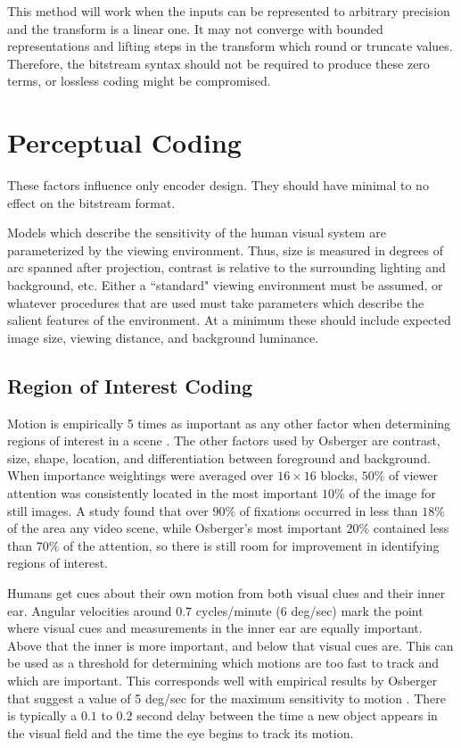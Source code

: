 \documentclass[11pt,letterpaper]{article}
\begin{document}
This method will work when the inputs can be represented to arbitrary precision
 and the transform is a linear one.
It may not converge with bounded representations and lifting steps in the
 transform which round or truncate values.
Therefore, the bitstream syntax should not be required to produce these zero
 terms, or lossless coding might be compromised.


\section{Perceptual Coding}

These factors influence only encoder design.
They should have minimal to no effect on the bitstream format.

Models which describe the sensitivity of the human visual system are
 parameterized by the viewing environment.
Thus, size is measured in degrees of arc spanned after projection, contrast is
 relative to the surrounding lighting and background, etc.
Either a ``standard" viewing environment must be assumed, or whatever
 procedures that are used must take parameters which describe the salient
 features of the environment.
At a minimum these should include expected image size, viewing distance, and
 background luminance.

\subsection{Region of Interest Coding}

Motion is empirically 5 times as important as any other factor when determining
 regions of interest in a scene \cite{Osb99, NC96}.
The other factors used by Osberger are contrast, size, shape, location, and
 differentiation between foreground and background.
When importance weightings were averaged over $16\times 16$ blocks, $50\%$ of
 viewer attention was consistently located in the most important $10\%$ of the
 image for still images.
A study found that over $90\%$ of fixations occurred in less than $18\%$ of the
 area any video scene, while Osberger's most important $20\%$ contained less
 than $70\%$ of the attention, so there is still room for improvement in
 identifying regions of interest.

Humans get cues about their own motion from both visual clues and their inner
 ear.
Angular velocities around $0.7$ cycles/minute (6 deg/sec) mark the point where
 visual cues and measurements in the inner ear are equally important.
Above that the inner is more important, and below that visual cues are.
This can be used as a threshold for determining which motions are too fast to
 track and which are important.
This corresponds well with empirical results by Osberger that suggest a value
 of 5 deg/sec for the maximum sensitivity to motion \cite{Osb99}.
There is typically a $0.1$ to $0.2$ second delay between the time a new object
 appears in the visual field and the time the eye begins to track its motion.
\end{document}
